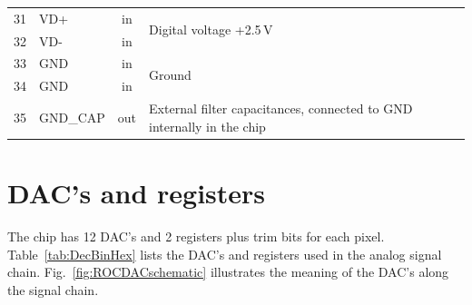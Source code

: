 \begin{table}[h]
\begin{center}
{\begin{tabular}{clcl}
	\midrule %
	31 & VD+             & in  & \multirow{2}{*}{Digital voltage +2.5\,V} \\
	32 & VD-             & in  & \\
	\midrule %
	33 & GND             & in  & \multirow{2}{*}{Ground}\\
	34 & GND             & in  & \\
	\midrule %
	35 & GND\_CAP        & out & External filter capacitances, connected to GND internally in the chip \\
	\bottomrule %
	\end{tabular}
	}
    \end{center}
\end{table}

\chapter{DAC's and registers}

The chip has 12 DAC's and 2 registers plus trim bits for each pixel. Table~\ref{tab:DecBinHex} lists the DAC's and registers used in the analog signal chain. Fig.~\ref{fig:ROCDACschematic} illustrates the meaning of the DAC's along the signal chain.

